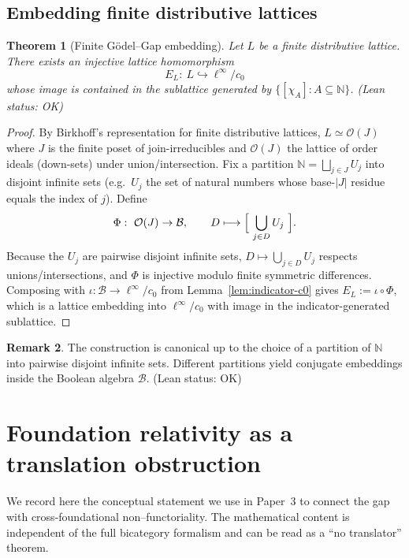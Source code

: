 \documentclass[11pt]{article}
\newtheorem{theorem}{Theorem}[section]
\theoremstyle{definition}
\newtheorem{remark}[theorem]{Remark}
\newcommand{\N}{\mathbb{N}}
\newcommand{\linf}{\ell^\infty}
\newcommand{\cnull}{c_0}
\newcommand{\leanok}{\textsf{\small (Lean status: OK)}}
\begin{document}
\subsection{Embedding finite distributive lattices}

\begin{theorem}[Finite Gödel--Gap embedding]\label{thm:finite-embed}
Let $L$ be a finite distributive lattice. There exists an injective lattice homomorphism
\[
  E_L:\ L\hookrightarrow \linf/\cnull
\]
whose image is contained in the sublattice generated by $\{[\chi_A]:A\subseteq\N\}$.
\leanok
\end{theorem}

\begin{proof}
By Birkhoff's representation for finite distributive lattices,
$L\simeq\mathcal O(J)$ where $J$ is the finite poset of join-irreducibles
and $\mathcal O(J)$ the lattice of order ideals (down-sets) under union/intersection.
Fix a partition $\N=\bigsqcup_{j\in J} U_j$ into disjoint infinite sets (e.g.\ $U_j$
the set of natural numbers whose base-$|J|$ residue equals the index of $j$).
Define
\[
  \Phi:\ \mathcal O(J)\to \mathcal B,\qquad
  D\longmapsto \Bigl[\ \bigcup_{j\in D} U_j\ \Bigr].
\]
Because the $U_j$ are pairwise disjoint infinite sets, $D\mapsto\bigcup_{j\in D}U_j$
respects unions/intersections, and $\Phi$ is injective modulo finite symmetric differences.
Composing with $\iota:\mathcal B\to\linf/\cnull$ from Lemma~\ref{lem:indicator-c0} gives
$E_L:=\iota\circ\Phi$, which is a lattice embedding into $\linf/\cnull$ with image in the
indicator-generated sublattice.
\end{proof}

\begin{remark}
The construction is canonical up to the choice of a partition of $\N$ into
pairwise disjoint infinite sets. Different partitions yield conjugate embeddings
inside the Boolean algebra $\mathcal B$. \leanok
\end{remark}

\section{Foundation relativity as a translation obstruction}
\label{sec:relativity}

We record here the conceptual statement we use in Paper~3 to connect the gap with
cross-foundational non--functoriality. The mathematical content is independent of the
full bicategory formalism and can be read as a ``no translator'' theorem.
\end{document}
